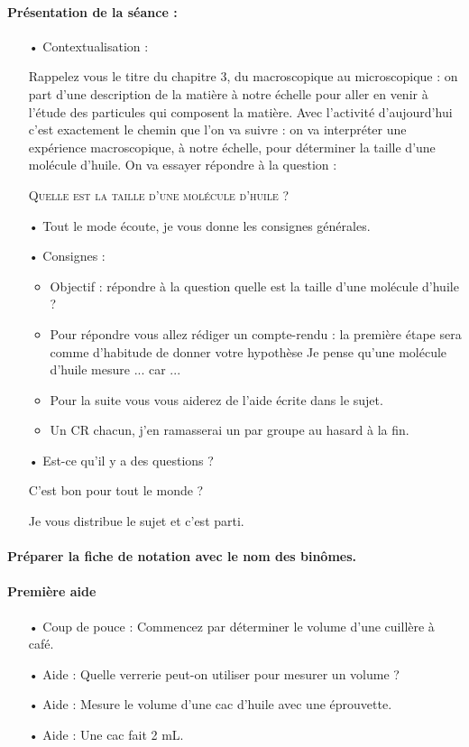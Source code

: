 \documentclass[12pt,a4paper]{article}
\begin{document}
\paragraph{Présentation de la séance :}
\begin{itemize}
\item[•] Contextualisation : 

\og Rappelez vous le titre du chapitre 3, du macroscopique au microscopique : on part d'une description de la matière à notre échelle pour aller en venir à l'étude des particules qui composent la matière.
Avec l'activité d'aujourd'hui c'est exactement le chemin que l'on va suivre : on va interpréter une expérience macroscopique, à notre échelle, pour déterminer la taille d'une molécule d'huile.
On va essayer répondre à la question :

\textsc{Quelle est la taille d'une molécule d'huile ?}\fg{} 

\item[•] \og Tout le mode écoute, je vous donne les consignes générales.\fg{}

\item[•] Consignes :
\begin{itemize}
\item Objectif : répondre à la question \og quelle est la taille d'une molécule d'huile ? \fg{}
\item Pour répondre vous allez rédiger un compte-rendu : la première étape sera comme d'habitude de donner votre hypothèse \og Je pense qu'une molécule d'huile mesure ... car ... \fg{}
\item Pour la suite vous vous aiderez de l'aide écrite dans le sujet.
\item Un CR chacun, j'en ramasserai un par groupe au hasard à la fin.
\end{itemize}

\item[•] Est-ce qu'il y a des questions ?

C'est bon pour tout le monde ?

Je vous distribue le sujet et c'est parti.
\end{itemize}

\paragraph{Préparer la fiche de notation avec le nom des binômes.}

\paragraph{Première aide}
\begin{itemize}
\item[•] Coup de pouce : Commencez par déterminer le volume d'une cuillère à café.
\item[•] Aide : Quelle verrerie peut-on utiliser pour mesurer un volume ?
\item[•] Aide : Mesure le volume d'une cac d'huile avec une éprouvette.
\item[•] Aide : Une cac fait 2 mL.
\end{itemize}
\end{document}
